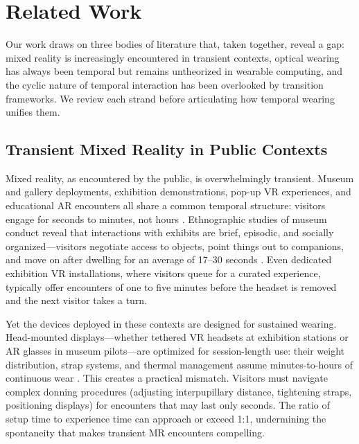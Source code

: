 \section{Related Work}

Our work draws on three bodies of literature that, taken together, reveal a gap: mixed reality is increasingly encountered in transient contexts, optical wearing has always been temporal but remains untheorized in wearable computing, and the cyclic nature of temporal interaction has been overlooked by transition frameworks. We review each strand before articulating how temporal wearing unifies them.

\subsection{Transient Mixed Reality in Public Contexts}

Mixed reality, as encountered by the public, is overwhelmingly transient. Museum and gallery deployments, exhibition demonstrations, pop-up VR experiences, and educational AR encounters all share a common temporal structure: visitors engage for seconds to minutes, not hours \cite{vomlehn2001exhibiting, li2024museum}. Ethnographic studies of museum conduct reveal that interactions with exhibits are brief, episodic, and socially organized---visitors negotiate access to objects, point things out to companions, and move on after dwelling for an average of 17--30 seconds \cite{vomlehn2001exhibiting}. Even dedicated exhibition VR installations, where visitors queue for a curated experience, typically offer encounters of one to five minutes before the headset is removed and the next visitor takes a turn.

Yet the devices deployed in these contexts are designed for sustained wearing. Head-mounted displays---whether tethered VR headsets at exhibition stations or AR glasses in museum pilots---are optimized for session-length use: their weight distribution, strap systems, and thermal management assume minutes-to-hours of continuous wear \cite{starner2001challenges}. This creates a practical mismatch. Visitors must navigate complex donning procedures (adjusting interpupillary distance, tightening straps, positioning displays) for encounters that may last only seconds. The ratio of setup time to experience time can approach or exceed 1:1, undermining the spontaneity that makes transient MR encounters compelling.

